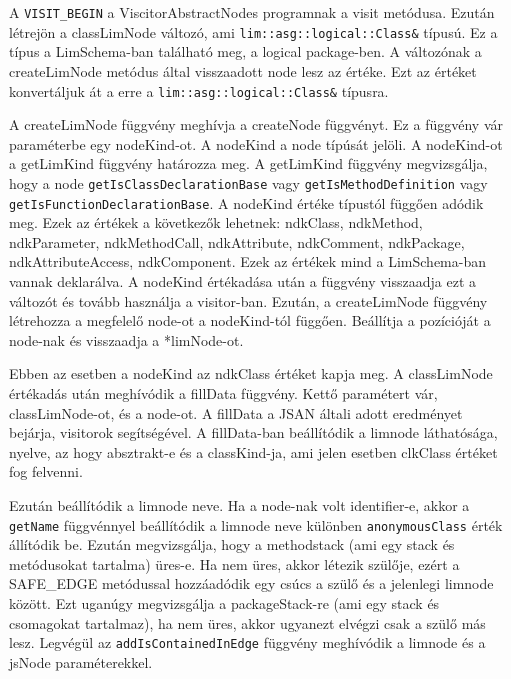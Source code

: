 A \texttt{VISIT\_BEGIN} a ViscitorAbstractNodes programnak a visit metódusa.
Ezután létrejön a classLimNode változó, ami \texttt{lim::asg::logical::Class\&} típusú.
Ez a típus a LimSchema-ban található meg, a logical package-ben.
A változónak a createLimNode metódus által visszaadott node lesz az értéke.
Ezt az értéket konvertáljuk át a erre a \texttt{lim::asg::logical::Class\&} típusra.

\noindent

A createLimNode függvény meghívja a createNode függvényt. Ez a függvény vár paraméterbe egy nodeKind-ot.
A nodeKind a node típúsát jelöli.
A nodeKind-ot a getLimKind függvény határozza meg.
A getLimKind függvény megvizsgálja, hogy a node \texttt{getIsClassDeclarationBase} vagy \texttt{getIsMethodDefinition} vagy \texttt{getIsFunctionDeclarationBase}.
A nodeKind értéke típustól függően adódik meg.
Ezek az értékek a következők lehetnek: ndkClass, ndkMethod, ndkParameter, ndkMethodCall, ndkAttribute, ndkComment, ndkPackage, ndkAttributeAccess, ndkComponent.
Ezek az értékek mind a LimSchema-ban vannak deklarálva. A nodeKind értékadása után a függvény visszaadja ezt a változót és tovább használja a visitor-ban.
Ezután, a createLimNode függvény létrehozza a megfelelő node-ot a nodeKind-tól függően. Beállítja a pozícióját a node-nak és visszaadja a *limNode-ot.

\noindent

Ebben az esetben a nodeKind az ndkClass értéket kapja meg.
A classLimNode értékadás után meghívódik a fillData függvény.
Kettő paramétert vár, classLimNode-ot, és a node-ot.
A fillData a JSAN általi adott eredményet bejárja, visitorok segítségével.
A fillData-ban beállítódik a limnode láthatósága, nyelve, az hogy absztrakt-e és a classKind-ja, ami jelen esetben clkClass értéket fog felvenni.

Ezután beállítódik a limnode neve. Ha a node-nak volt identifier-e, akkor a \texttt{getName} függvénnyel beállítódik a limnode neve különben \texttt{anonymousClass} érték állítódik be.
Ezután megvizsgálja, hogy a methodstack (ami egy stack és metódusokat tartalma) üres-e.
Ha nem üres, akkor létezik szülője, ezért a SAFE\_EDGE metódussal hozzáadódik egy csúcs a szülő és a jelenlegi limnode között.
Ezt uganúgy megvizsgálja a  packageStack-re (ami egy stack és csomagokat tartalmaz), ha nem üres, akkor ugyanezt elvégzi csak a szülő más lesz.
Legvégül az \texttt{addIsContainedInEdge} függvény meghívódik a limnode és a jsNode paraméterekkel.

\noindent

